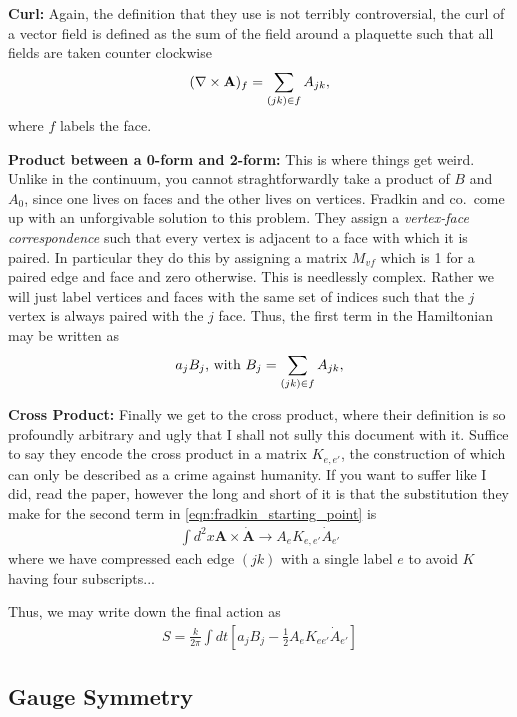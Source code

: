 \documentclass[11pt, oneside]{article} %
\numberwithin{equation}{section}
\begin{document}
\textbf{Curl: } Again, the definition that they use is not terribly controversial, the curl of a vector field is defined as the sum of the field around a plaquette such that all fields are taken counter clockwise
\begin{align}
    (\nabla \times \textbf A)_f = \sum_{(jk) \in f} A_{jk},
\end{align}
where $f$ labels the face.

\textbf{Product between a 0-form and 2-form: }This is where things get weird. Unlike in the continuum, you cannot straghtforwardly take a product of $B$ and $A_0$, since one lives on faces and the other lives on vertices. Fradkin and co.~come up with an unforgivable solution to this problem. They assign a \textit{vertex-face correspondence} such that every vertex is adjacent to a face with which it is paired. In particular they do this by assigning a matrix $M_{vf}$ which is 1 for a paired edge and face and zero otherwise. This is needlessly complex. Rather we will just label vertices and faces with the same set of indices such that the $j$ vertex is always paired with the $j$ face. Thus, the first term in the Hamiltonian may be written as 
\begin{align}
    a_j B_j\textup{, with } B_j = \sum_{(jk) \in f} A_{jk},
\end{align}

\textbf{Cross Product: } Finally we get to the cross product, where their definition is so profoundly arbitrary and ugly that I shall not sully this document with it. Suffice to say they encode the cross product in a matrix $K_{e,e'}$, the construction of which can only be described as a crime against humanity. If you want to suffer like I did, read the paper, however the long and short of it is that the substitution they make for the second term in \ref{eqn:fradkin_starting_point} is 
\begin{align}
    \int d^2x \textbf {A} \times \dot {\textbf {A}} 
    \rightarrow 
    A_e K_{e,e'} \dot A_{e'}
\end{align}
where we have compressed each edge $(jk)$ with a single label $e$ to avoid $K$ having four subscripts...

Thus, we may write down the final action as 
\begin{align}
    S = \frac k{2\pi} \int dt \left [ 
    a_j B_j - \frac 12 A_e K_{ee'} \dot A_{e'}
    \right ]
\end{align}

\subsection{Gauge Symmetry}
\end{document}
